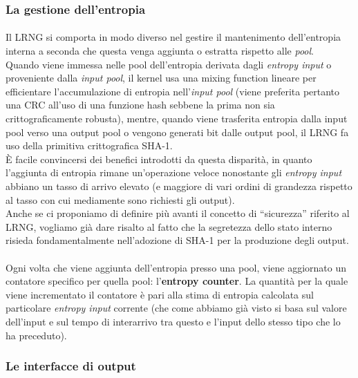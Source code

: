 \documentclass{article}
\begin{document}
 \subsubsection{La gestione dell'entropia}\label{aggiuntaentropia}
 \paragraph{}Il LRNG si comporta in modo diverso nel gestire
 il mantenimento dell'entropia interna a seconda che questa venga
 aggiunta o estratta rispetto alle \emph{pool}. \\
 Quando viene immessa nelle pool dell'entropia derivata dagli
 \emph{entropy input} o proveniente dalla \emph{input pool}, 
 il kernel usa una mixing function lineare per efficientare
 l'accumulazione di entropia nell'\emph{input pool} (viene preferita
 pertanto una CRC all'uso di una funzione hash sebbene la prima non sia
 crittograficamente robusta), mentre, quando viene trasferita entropia
 dalla input pool verso una output pool o vengono generati bit dalle output
 pool, il LRNG fa uso della primitiva crittografica SHA-1. \\
 È facile convincersi dei benefici introdotti da questa disparità, in quanto l'aggiunta di entropia
 rimane un'operazione veloce nonostante gli \emph{entropy input} abbiano un
 tasso di arrivo elevato (e maggiore di vari ordini di grandezza rispetto al
 tasso con cui mediamente sono richiesti gli output).\\ 
 Anche se ci proponiamo di definire più avanti il concetto di ``sicurezza''
 riferito al LRNG, vogliamo già dare risalto al fatto che la segretezza
 dello stato interno risieda fondamentalmente nell'adozione di SHA-1 per la
 produzione degli output.
 
 \paragraph{}Ogni volta che viene aggiunta dell'entropia presso una pool, viene
 aggiornato un contatore specifico per quella pool: l'\textbf{entropy counter}.
 La quantità per la quale viene incrementato il contatore è pari alla stima di
 entropia calcolata sul particolare \emph{entropy input} corrente (che come
 abbiamo già visto si basa sul valore dell'input e sul tempo di interarrivo tra
 questo e l'input dello stesso tipo che lo ha preceduto).
 \subsubsection{Le interfacce di output}\label{interfacceoutput}
\end{document}
